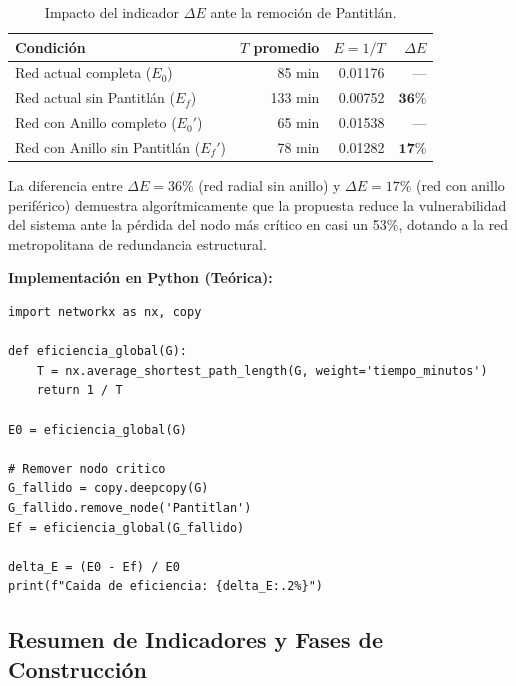 \begin{table}[H]
    \centering
    \caption{Impacto del indicador $\Delta E$ ante la remoción de Pantitlán.}
    \label{tab:robustez}
    \begin{tabularx}{\textwidth}{X r r r}
        \toprule
        \textbf{Condición} & \textbf{$T$ promedio} &
        \textbf{$E = 1/T$} & \textbf{$\Delta E$} \\
        \midrule
        Red actual completa ($E_0$)          & 85 min & 0.01176 & --- \\
        Red actual sin Pantitlán ($E_f$)     & 133 min & 0.00752 & $\mathbf{36\%}$ \\
        Red con Anillo completo ($E_0'$)     & 65 min & 0.01538 & --- \\
        Red con Anillo sin Pantitlán ($E_f'$) & 78 min & 0.01282 & $\mathbf{17\%}$ \\
        \bottomrule
    \end{tabularx}
\end{table}
 
La diferencia entre $\Delta E = 36\%$ (red radial sin anillo) y $\Delta E = 17\%
$
(red con anillo periférico) demuestra algorítmicamente que la propuesta reduce
la
vulnerabilidad del sistema ante la pérdida del nodo más crítico en casi un 53\%,
dotando a la red metropolitana de redundancia estructural.
 
\textbf{Implementación en Python (Teórica):}
 
\begin{lstlisting}[style=estiloPython, caption={Cálculo de Robustez Geométrica $\Delta E$ con NetworkX.}, label={lst:robustez}]
import networkx as nx, copy
 
def eficiencia_global(G):
    T = nx.average_shortest_path_length(G, weight='tiempo_minutos')
    return 1 / T
 
E0 = eficiencia_global(G)
 
# Remover nodo critico
G_fallido = copy.deepcopy(G)
G_fallido.remove_node('Pantitlan')
Ef = eficiencia_global(G_fallido)
 
delta_E = (E0 - Ef) / E0
print(f"Caida de eficiencia: {delta_E:.2%}")
\end{lstlisting}

 
\subsection{Resumen de Indicadores y Fases de Construcción}
\label{subsec:resumen-indicadores}
 
